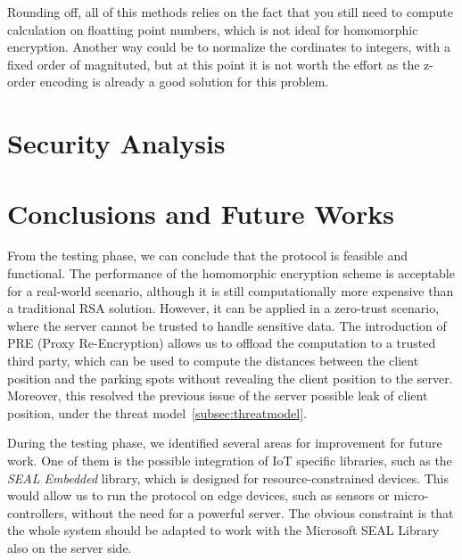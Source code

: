 Rounding off, all of this methods relies on the fact that you still need to compute calculation on floatting point numbers, which is not ideal for homomorphic encryption. Another way could be to normalize the cordinates to integers, with a fixed order of magnituted, but at this point it is not worth the effort as the z-order encoding is already a good solution for this problem.


\section{Security Analysis}



\section{Conclusions and Future Works}

From the testing phase, we can conclude that the protocol is feasible and functional. The performance of the homomorphic encryption scheme is acceptable for a real-world scenario, although it is still computationally more expensive than a traditional RSA solution. However, it can be applied in a zero-trust scenario, where the server cannot be trusted to handle sensitive data. The introduction of PRE (Proxy Re-Encryption) allows us to offload the computation to a trusted third party, which can be used to compute the distances between the client position and the parking spots without revealing the client position to the server. Moreover, this resolved the previous issue of the server possible leak of client position, under the threat model~\cref{subsec:threatmodel}.

During the testing phase, we identified several areas for improvement for future work. One of them is the possible integration of IoT specific libraries, such as the \emph{SEAL Embedded} library, which is designed for resource-constrained devices. This would allow us to run the protocol on edge devices, such as sensors or micro-controllers, without the need for a powerful server. The obvious constraint is that the whole system should be adapted to work with the Microsoft SEAL Library also on the server side. 


